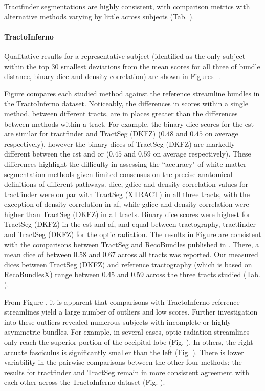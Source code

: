 Tractfinder segmentations are highly consistent, with comparison metrics with alternative methods varying by little across subjects (Tab. ).

\paragraph{TractoInferno}

Qualitative results for a representative subject (identified as the only subject within the top 30 smallest deviations from the mean scores for all three of bundle distance, binary \gls{dice} and density correlation) are shown in Figures -.

Figure  compares each studied method against the reference streamline bundles in the TractoInferno dataset.
Noticeably, the differences in scores within a single method, between different tracts, are in places greater than the differences between methods within a tract.
For example, the binary \gls{dice} scores for the \gls{cst} are similar for tractfinder and TractSeg (DKFZ) ($0.48$ and $0.45$ on average respectively), however the binary \gls{dice}s of TractSeg (DKFZ) are markedly different between the \gls{cst} and \gls{or} ($0.45$ and $0.59$ on average respectively).
These differences highlight the difficulty in assessing the ``accuracy" of white matter segmentation methods given limited consensus on the precise anatomical definitions of different pathways.
\gls{dice}, \gls{gdice} and density correlation values for tractfinder were on par with TractSeg (XTRACT) in all three tracts, with the exception of density correlation in \gls{af}, while \gls{gdice} and density correlation were higher than TractSeg (DKFZ) in all tracts.
Binary \gls{dice} scores were highest for TractSeg (DKFZ) in the \gls{cst} and \gls{af}, and equal between tractography, tractfinder and TractSeg (DKFZ)  for the optic radiation.
The results in Figure  are consistent with the comparisons between TractSeg and RecoBundles published in \textcite{Wasserthal2018}.
There, a mean \gls{dice} of between 0.58 and 0.67 across all tracts was reported.
Our measured \gls{dice}s between TractSeg (DKFZ) and reference tractography (which is based on RecoBundlesX\autocite{Garyfallidis2018}) range between 0.45 and 0.59 across the three tracts studied (Tab. ).

From Figure , it is apparent that comparisons with TractoInferno reference streamlines yield a large number of outliers and low scores.
Further investigation into these outliers revealed numerous subjects with incomplete or highly asymmetric bundles.
For example, in several cases, optic radiation streamlines only reach the superior portion of the occipital lobe (Fig. ).
In others, the right arcuate fasciculus is significantly smaller than the left (Fig. ).
There is lower variability in the pairwise comparisons between the other four methods: the results for tractfinder and TractSeg remain in more consistent agreement with each other across the TractoInferno dataset (Fig. ).

